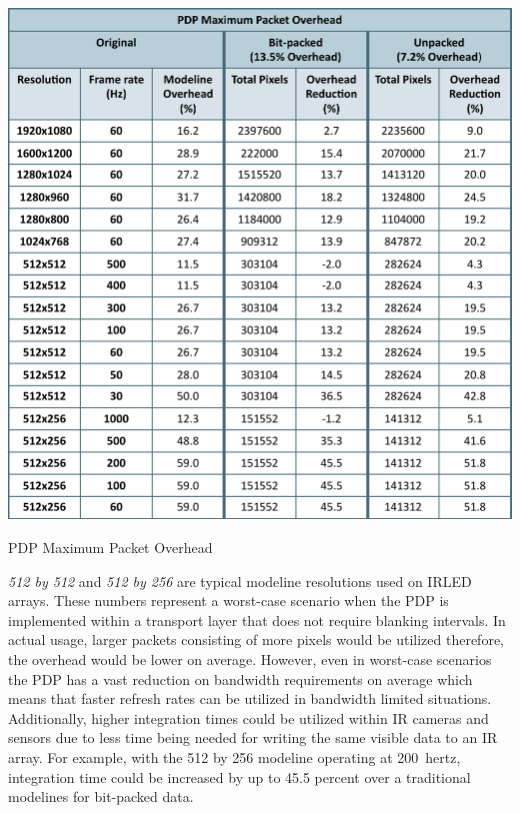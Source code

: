     \begin{table}
        \includegraphics[width=1.0\textwidth]{fig/maximum_packet_overhead.pdf}
        \caption{PDP Maximum Packet Overhead}
        \label{tbl:pdp_efficiency}
    \end{table}

    {\it 512 by 512} and {\it 512 by 256} are typical modeline resolutions used on IRLED arrays. These numbers represent a worst-case scenario when the PDP is implemented within a transport layer that does not require blanking intervals. In actual usage, larger packets consisting of more pixels would be utilized therefore, the overhead would be lower on average. However, even in worst-case scenarios the PDP has a vast reduction on bandwidth requirements on average which means that faster refresh rates can be utilized in bandwidth limited situations. Additionally, higher integration times could be utilized within IR cameras and sensors due to less time being needed for writing the same visible data to an IR array. For example, with the 512 by 256 modeline operating at \mbox{200 hertz}, integration time could be increased by up to 45.5 percent over a traditional modelines for bit-packed data.

